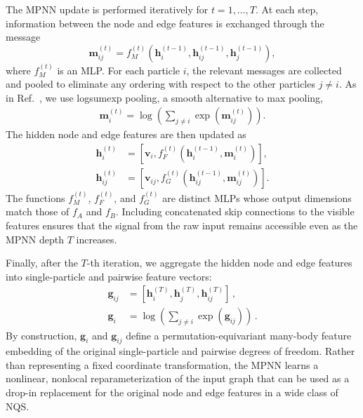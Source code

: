 The MPNN update is performed iteratively for \( t = 1, \dots, T \). At each step, information between the node and edge features is exchanged through the message
\begin{equation}
\mathbf{m}_{ij}^{(t)} = f_M^{(t)}\!\left( \mathbf{h}_i^{(t-1)}, \mathbf{h}_{ij}^{(t-1)}, \mathbf{h}_j^{(t-1)} \right) ,
\label{eq:mpnn-message}
\end{equation}
where \( f_M^{(t)} \) is an MLP. For each particle \( i \), the relevant messages are collected and pooled to eliminate any ordering with respect to the other particles \( j \neq i \). As in Ref.~\cite{kim_neural-network_2024}, we use logsumexp pooling, a smooth alternative to max pooling,
\begin{align*}
\mathbf{m}_{i}^{(t)} = \log\!\left(\sum_{j \neq i} \exp\!\left(\mathbf{m}_{ij}^{(t)}\right)\right) .
\end{align*}
The hidden node and edge features are then updated as
\begin{align*}
\mathbf{h}_i^{(t)} &= \left[ \mathbf{v}_i, f_F^{(t)}\!\left(\mathbf{h}_i^{(t-1)}, \mathbf{m}_{i}^{(t)}\right) \right] , \\
\mathbf{h}_{ij}^{(t)} &= \left[ \mathbf{v}_{ij}, f_G^{(t)}\!\left(\mathbf{h}_{ij}^{(t-1)}, \mathbf{m}_{ij}^{(t)}\right) \right] .
\end{align*}
The functions \( f_M^{(t)} \), \( f_F^{(t)} \), and \( f_G^{(t)} \) are distinct MLPs whose output dimensions match those of \( f_A \) and \( f_B \). Including concatenated skip connections to the visible features ensures that the signal from the raw input remains accessible even as the MPNN depth \( T \) increases.


Finally, after the \( T \)-th iteration, we aggregate the hidden node and edge features into single-particle and pairwise feature vectors:
\begin{align*}
\mathbf{g}_{ij} &= \left[ \mathbf{h}_i^{(T)}, \mathbf{h}_j^{(T)}, \mathbf{h}_{ij}^{(T)} \right] \,, \\ 
\mathbf{g}_i &=  \log\left(\sum_{j \neq i} \exp\left(\mathbf{g}_{ij}\right) \right)\,.
\end{align*}
By construction, \( \mathbf{g}_i \) and \( \mathbf{g}_{ij} \) define a permutation-equivariant
many-body feature embedding of the original single-particle and pairwise degrees of freedom. Rather than representing a fixed coordinate transformation, the MPNN learns a nonlinear, nonlocal reparameterization of the input graph that can be used as a drop-in replacement for the original node and edge features in a wide class of NQS.


